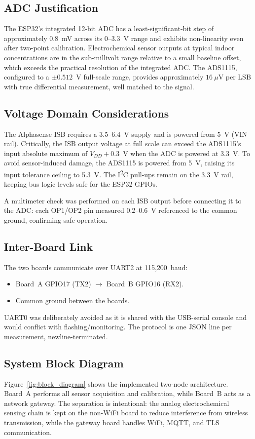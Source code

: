 \documentclass[conference]{IEEEtran}
\begin{document}
\subsection{ADC Justification}
The ESP32's integrated 12-bit ADC has a least-significant-bit step of approximately $0.8$~mV across its 0--3.3~V range and exhibits non-linearity even after two-point calibration. Electrochemical sensor outputs at typical indoor concentrations are in the sub-millivolt range relative to a small baseline offset, which exceeds the practical resolution of the integrated ADC. The ADS1115, configured to a $\pm 0.512$~V full-scale range, provides approximately $16~\mu$V per LSB with true differential measurement, well matched to the signal.

\subsection{Voltage Domain Considerations}
The Alphasense ISB requires a 3.5--6.4~V supply and is powered from 5~V (VIN rail). Critically, the ISB output voltage at full scale can exceed the ADS1115's input absolute maximum of $V_{DD}+0.3$~V when the ADC is powered at 3.3~V. To avoid sensor-induced damage, the ADS1115 is powered from 5~V, raising its input tolerance ceiling to 5.3~V. The I\textsuperscript{2}C pull-ups remain on the 3.3~V rail, keeping bus logic levels safe for the ESP32 GPIOs.

A multimeter check was performed on each ISB output before connecting it to the ADC: each OP1/OP2 pin measured 0.2--0.6~V referenced to the common ground, confirming safe operation.

\subsection{Inter-Board Link}
The two boards communicate over UART2 at 115{,}200~baud:
\begin{itemize}
\item Board~A GPIO17 (TX2) $\rightarrow$ Board~B GPIO16 (RX2).
\item Common ground between the boards.
\end{itemize}
UART0 was deliberately avoided as it is shared with the USB-serial console and would conflict with flashing/monitoring. The protocol is one JSON line per measurement, newline-terminated.

\subsection{System Block Diagram}
Figure~\ref{fig:block_diagram} shows the implemented two-node architecture. Board~A performs all sensor acquisition and calibration, while Board~B acts as a network gateway. The separation is intentional: the analog electrochemical sensing chain is kept on the non-WiFi board to reduce interference from wireless transmission, while the gateway board handles WiFi, MQTT, and TLS communication.
\end{document}
